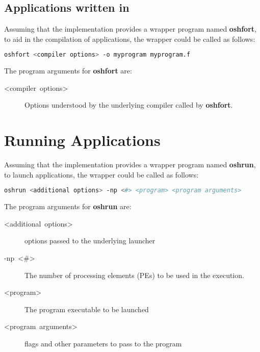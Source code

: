 \subsection{Applications written in \Fortran}

Assuming that the implementation provides a wrapper program named
\textbf{oshfort}, to aid in the compilation of \Fortran{} applications,
the wrapper could be called as follows:

\begin{lstlisting}[language=bash]
oshfort <compiler options> -o myprogram myprogram.f
\end{lstlisting}


The program arguments for \textbf{oshfort} are:
\begin{description}
\item [{<compiler\ options>}] Options understood by the underlying \Fortran{}
compiler called by \textbf{oshfort}.
\end{description}

\section{Running Applications}

Assuming that the implementation provides a wrapper program named
\textbf{oshrun}, to launch \openshmem applications, the wrapper could
be called as follows:

\begin{lstlisting}[language=bash]
oshrun <additional options> -np <#> <program> <program arguments>
\end{lstlisting}


The program arguments for \textbf{oshrun} are:
\begin{description}
\item [{<additional\ options>}] options passed to the underlying launcher
\item [{-np~<\#>}] The number of processing elements (PEs) to be used
in the execution.
\item [{<program>}] The program executable to be launched
\item [{<program\ arguments>}] flags and other parameters to pass to the program
\end{description}
